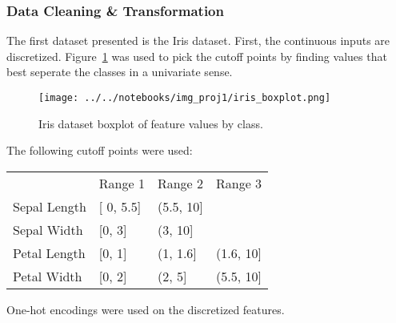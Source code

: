 \documentclass{amsart}
\begin{document}
    \subsubsection*{Data Cleaning \& Transformation}
    The first dataset presented is the Iris dataset\cite{irisdataset}. First, the continuous inputs are discretized. Figure~\ref{iris_boxplot}
    was used to pick the cutoff points by finding values that best seperate the classes in a univariate sense.
    \begin{figure}
    \centering
    \texttt{[image: ../../notebooks/img\_proj1/iris\_boxplot.png]}
    \caption{Iris dataset boxplot of feature values by class.}
    \label{iris_boxplot}
    \end{figure}
    The following cutoff points were used:
    \begin{table}[]
    \begin{tabular}{llll}
    {} &  Range 1  & Range 2 & Range 3\\
    Sepal Length &  {[} 0, 5.5{]} & (5.5, 10{]} & {} \\
    Sepal Width &  {[}0, 3{]} & (3, 10{]} & {} \\
    Petal Length &  {[}0, 1{]} & (1, 1.6{]} & (1.6, 10{]} \\
    Petal Width &  {[}0, 2{]} & (2, 5{]} & (5.5, 10{]}
    \end{tabular}
    \end{table}
    One-hot encodings were used on the discretized features.
\end{document}

